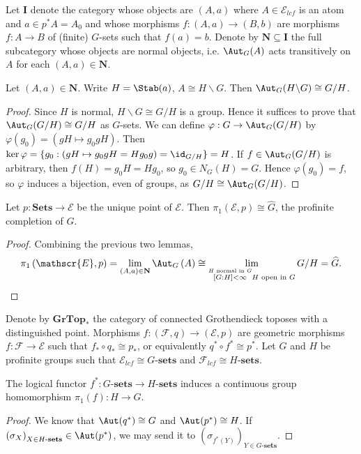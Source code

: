 Let $\mathbf{I}$ denote the category whose objects are $(A,a)$ where $A \in \mathscr{E}_{lcf}$ is an atom and $a \in p^*A = A_0$ and whose morphisms $f : (A,a) \to (B,b)$ are morphisms $f : A \to B$ of (finite) $G$-sets such that $f(a) = b$. Denote by $\mathbf{N} \subseteq \mathbf{I}$ the full subcategory whose objects are normal objects, i.e. $\Aut_G(A)$ acts transitively on $A$ for each $(A,a) \in \mathbf{N}$.

\begin{lemma}
Let $(A,a) \in \mathbf{N}$. Write $H = \Stab(a)$, $A \cong H \backslash G$. Then $\Aut_G(H \backslash G) \cong G/H$.
\end{lemma}
\begin{proof}
Since $H$ is normal, $H \backslash G \cong G / H$ is a group. Hence it suffices to prove that $\Aut_G(G/H) \cong G/H$ as $G$-sets. We can define $\varphi : G \to \Aut_G(G/H)$ by $\varphi(g_0) = (gH \mapsto g_0 g H)$. Then $\ker \varphi = \{g_0 : \left( gH \mapsto g_0 gH = Hg_0 g \right) = \id_{G/H} \} = H$. If $f \in \Aut_G(G/H)$ is arbitrary, then $f(H) = g_0 H = H g_0$, so $g_0 \in N_G(H) = G$. Hence $\varphi(g_0) = f$, so $\varphi$ induces a bijection, even of groups, as $G/H \cong \Aut_G(G/H)$.
\end{proof}

\begin{theorem}
\label{thm:the fundamental group of BG is the profinite completion of G}
Let $p : \mathbf{Sets} \to \mathscr{E}$ be the unique point of $\mathscr{E}$. Then $\pi_1(\mathscr{E}, p) \cong \widehat{G}$, the profinite completion of $G$.
\end{theorem}
\begin{proof}
Combining the previous two lemmas,
\[ \pi_1\left( \mathscr{E}, p \right) = \lim_{ (A,a) \in \mathbf{N} } \Aut_G \left(A \right) \cong \lim_{\stackrel{H \text{ normal in } G}{[G:H] < \infty}{H \text{ open in } G} } G/H = \widehat{G}. \]
\end{proof}

Denote by $\mathbf{GrTop}_*$ the category of connected Grothendieck toposes with a distinguished point. Morphisms $f : (\mathscr{F},q) \to (\mathscr{E},p)$ are geometric morphisms $f : \mathscr{F} \to \mathscr{E}$ such that $f_* \circ q_* \cong p_*$, or equivalently $q^* \circ f^* \cong p^*$. Let $G$ and $H$ be profinite groups such that $\mathscr{E}_{lcf} \cong G\text{-}\mathbf{sets}$ and $\mathscr{F}_{lcf} \cong H\text{-}\mathbf{sets}$.

\begin{lemma}
The logical functor $f^* : G\text{-}\mathbf{sets} \to H\text{-}\mathbf{sets}$ induces a continuous group homomorphism $\pi_1(f) : H \to G$.
\end{lemma}
\begin{proof}
We know that $\Aut(q^*) \cong G$ and $\Aut(p^*) \cong H$. If $\left(\sigma_X\right)_{X \in H\text{-}\mathbf{sets}} \in \Aut(p^*)$, we may send it to $\left(\sigma_{f^*(Y)} \right)_{Y \in G\text{-}\mathbf{sets}}$.
\end{proof}

